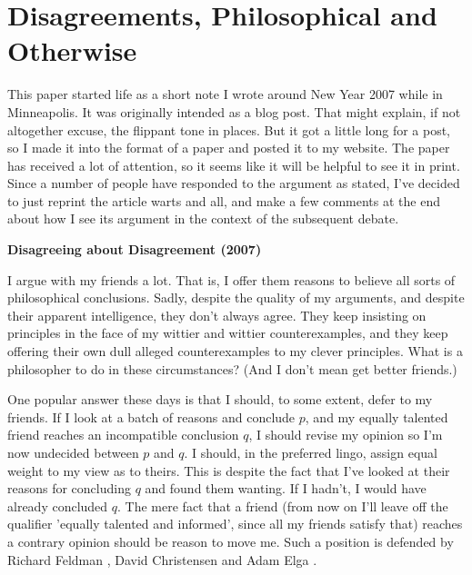 \chapter{Disagreements, Philosophical and Otherwise}


This paper started life as a short note I wrote around New Year 2007 while in Minneapolis. It was originally intended as a blog post. That might explain, if not altogether excuse, the flippant tone in places. But it got a little long for a post, so I made it into the format of a paper and posted it to my website. The paper has received a lot of attention, so it seems like it will be helpful to see it in print. Since a number of people have responded to the argument as stated, I've decided to just reprint the article warts and all, and make a few comments at the end about how I see its argument in the context of the subsequent debate.

\begin{Large}
\begin{center}
\textbf{Disagreeing about Disagreement (2007)}
\end{center}
\end{Large}

\noindent I argue with my friends a lot. That is, I offer them reasons to believe all sorts of philosophical conclusions. Sadly, despite the quality of my arguments, and despite their apparent intelligence, they don't always agree. They keep insisting on principles in the face of my wittier and wittier counterexamples, and they keep offering their own dull alleged counterexamples to my clever principles. What is a philosopher to do in these circumstances? (And I don't mean get better friends.)

One popular answer these days is that I should, to some extent, defer to my friends. If I look at a batch of reasons and conclude $p$, and my equally talented friend reaches an incompatible conclusion $q$, I should revise my opinion so I'm now undecided between $p$ and $q$. I should, in the preferred lingo, assign equal weight to my view as to theirs. This is despite the fact that I've looked at their reasons for concluding $q$ and found them wanting. If I hadn't, I would have already concluded $q$. The mere fact that a friend (from now on I'll leave off the qualifier 'equally talented and informed', since all my friends satisfy that) reaches a contrary opinion should be reason to move me. Such a position is defended by Richard Feldman \citeyearpar{Feldman2005-FELRTE, Feldman2006-FELEPA}, David Christensen \citeyearpar{Christensen2007-CHREOD} and Adam Elga \citeyearpar{Elga2007-ELGRAD}.

